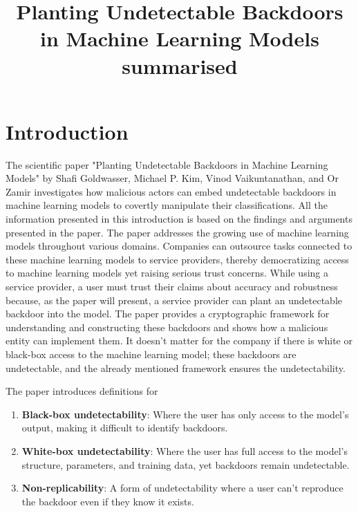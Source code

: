\documentclass[
	fontsize=12pt,
	headings=small,
	parskip=quarter,
	bibliography=totoc,
	numbers=noenddot,       
	open=any,               
 	final                   
]{scrreprt}
\title{Planting Undetectable Backdoors in Machine Learning Models summarised}
\begin{document}

\tableofcontents
\thispagestyle{empty}
\setcounter{page}{0}


\chapter{Introduction}
The scientific paper "Planting Undetectable Backdoors in Machine Learning Models" by Shafi Goldwasser, Michael P. Kim, Vinod Vaikuntanathan, and Or Zamir \cite{goldwasser2022backdoors} investigates how malicious actors can embed undetectable backdoors in machine learning models to covertly manipulate their classifications. All the information presented in this introduction is based on the findings and arguments presented in the paper. The paper addresses the growing use of machine learning models throughout various domains. Companies can outsource tasks connected to these machine learning models to service providers, thereby democratizing access to machine learning models yet raising serious trust concerns. While using a service provider, a user must trust their claims about accuracy and robustness because, as the paper will present, a service provider can plant an undetectable backdoor into the model. The paper provides a cryptographic framework for understanding and constructing these backdoors and shows how a malicious entity can implement them. It doesn’t matter for the company if there is white or black-box access to the machine learning model; these backdoors are undetectable, and the already mentioned framework ensures the undetectability.
\par The paper introduces definitions for  
\begin{enumerate} \itemsep -5pt
	\item \textbf{Black-box undetectability}: Where the user has only access to the model's output, making it difficult to identify backdoors. 
	\item \textbf{White-box undetectability}: Where the user has full access to the model's structure, parameters, and training data, yet backdoors remain undetectable. 
	\item \textbf{Non-replicability}: A form of undetectability where a user can't reproduce the backdoor even if they know it exists. 
\end{enumerate}
\end{document}
